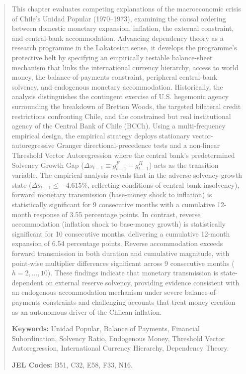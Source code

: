 \documentclass[11pt,a4paper]{article}
\begin{document}
\begin{titlepage}
\begin{abstract}
This chapter evaluates competing explanations of the macroeconomic crisis of Chile's Unidad Popular (1970--1973), examining the causal ordering between domestic monetary expansion, inflation, the external constraint, and central-bank accommodation. Advancing dependency theory as a research programme in the Lakatosian sense, it develops the programme's protective belt by specifying an empirically testable balance-sheet mechanism that links the international currency hierarchy, access to world money, the balance-of-payments constraint, peripheral central-bank solvency, and endogenous monetary accommodation. Historically, the analysis distinguishes the contingent exercise of U.S. hegemonic agency surrounding the breakdown of Bretton Woods, the targeted bilateral credit restrictions confronting Chile, and the constrained but real institutional agency of the Central Bank of Chile (BCCh). Using a multi-frequency empirical design, the empirical strategy deploys stationary vector-autoregressive Granger directional-precedence tests and a non-linear Threshold Vector Autoregression where the central bank's predetermined Solvency Growth Gap ($\Delta s_{t-1} \equiv g^F_{t-1} - g^H_{t-1}$) acts as the transition variable. The empirical analysis reveals that in the adverse solvency-growth state ($\Delta s_{t-1} \le -4.615\%$, reflecting conditions of central bank insolvency), forward monetary transmission (base-money shock to inflation) is statistically significant for 9 consecutive months with a cumulative 12-month response of 3.55 percentage points. In contrast, reverse accommodation (inflation shock to base-money growth) is statistically significant for 10 consecutive months, delivering a cumulative 12-month expansion of 6.54 percentage points. Reverse accommodation exceeds forward transmission in both duration and cumulative magnitude, with point-wise multiplier differences significant across 9 consecutive months ($h=2,\dots,10$). These findings indicate that monetary transmission is state-dependent on external reserve solvency, providing evidence consistent with an endogenous accommodation mechanism under severe balance-of-payments constraints and challenging accounts that treat money creation as an autonomous driver of the Chilean inflation.

\vspace{1.0em}
\noindent\textbf{Keywords:} Unidad Popular, Balance of Payments, Financial Subordination, Solvency Ratio, Endogenous Money, Threshold Vector Autoregression, International Currency Hierarchy, Dependency Theory.

\vspace{0.4em}
\noindent\textbf{JEL Codes:} B51, C32, E58, F33, N16.
\end{abstract}
\vfill
\end{titlepage}
\end{document}
